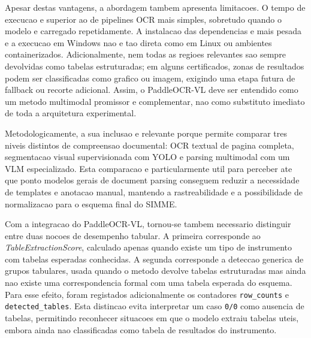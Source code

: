 Apesar destas vantagens, a abordagem tambem apresenta limitacoes. O tempo de
execucao e superior ao de pipelines OCR mais simples, sobretudo quando o modelo
e carregado repetidamente. A instalacao das dependencias e mais pesada e a
execucao em Windows nao e tao direta como em Linux ou ambientes containerizados.
Adicionalmente, nem todas as regioes relevantes sao sempre devolvidas como
tabelas estruturadas; em alguns certificados, zonas de resultados podem ser
classificadas como grafico ou imagem, exigindo uma etapa futura de fallback ou
recorte adicional. Assim, o PaddleOCR-VL deve ser entendido como um metodo
multimodal promissor e complementar, nao como substituto imediato de toda a
arquitetura experimental.

Metodologicamente, a sua inclusao e relevante porque permite comparar tres
niveis distintos de compreensao documental: OCR textual de pagina completa,
segmentacao visual supervisionada com YOLO e parsing multimodal com um VLM
especializado. Esta comparacao e particularmente util para perceber ate que
ponto modelos gerais de document parsing conseguem reduzir a necessidade de
templates e anotacao manual, mantendo a rastreabilidade e a possibilidade de
normalizacao para o esquema final do SIMME.


Com a integracao do PaddleOCR-VL, tornou-se tambem necessario distinguir entre
duas nocoes de desempenho tabular. A primeira corresponde ao
\textit{TableExtractionScore}, calculado apenas quando existe um tipo de
instrumento com tabelas esperadas conhecidas. A segunda corresponde a deteccao
generica de grupos tabulares, usada quando o metodo devolve tabelas estruturadas
mas ainda nao existe uma correspondencia formal com uma tabela esperada do
esquema. Para esse efeito, foram registados adicionalmente os contadores
\texttt{row\_counts} e \texttt{detected\_tables}. Esta distincao evita interpretar
um caso \texttt{0/0} como ausencia de tabelas, permitindo reconhecer situacoes em
que o modelo extraiu tabelas uteis, embora ainda nao classificadas como tabela de
resultados do instrumento.


